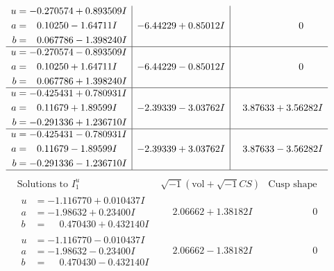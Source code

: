 \documentclass[1p]{elsarticle_modified}
\theoremstyle{definition}
\newcommand{\I}{\sqrt{-1}}
\begin{document}
$$\begin{array}{c|c|c}
\begin{aligned}
u &= -0.270574 + 0.893509 I \\
a &= \phantom{-}0.10250 - 1.64711 I \\
b &= \phantom{-}0.067786 - 1.398240 I\end{aligned}
 & -6.44229 + 0.85012 I & \phantom{-0.000000 } 0 \\ \hline\begin{aligned}
u &= -0.270574 - 0.893509 I \\
a &= \phantom{-}0.10250 + 1.64711 I \\
b &= \phantom{-}0.067786 + 1.398240 I\end{aligned}
 & -6.44229 - 0.85012 I & \phantom{-0.000000 } 0 \\ \hline\begin{aligned}
u &= -0.425431 + 0.780931 I \\
a &= \phantom{-}0.11679 + 1.89599 I \\
b &= -0.291336 + 1.236710 I\end{aligned}
 & -2.39339 - 3.03762 I & \phantom{-}3.87633 + 3.56282 I \\ \hline\begin{aligned}
u &= -0.425431 - 0.780931 I \\
a &= \phantom{-}0.11679 - 1.89599 I \\
b &= -0.291336 - 1.236710 I\end{aligned}
 & -2.39339 + 3.03762 I & \phantom{-}3.87633 - 3.56282 I\\
 \hline 
 \end{array}$$\newpage$$\begin{array}{c|c|c}  
\text{Solutions to }I^u_{1}& \I (\text{vol} + \sqrt{-1}CS) & \text{Cusp shape}\\
 \hline 
\begin{aligned}
u &= -1.116770 + 0.010437 I \\
a &= -1.98632 + 0.23400 I \\
b &= \phantom{-}0.470430 + 0.432140 I\end{aligned}
 & \phantom{-}2.06662 + 1.38182 I & \phantom{-0.000000 } 0 \\ \hline\begin{aligned}
u &= -1.116770 - 0.010437 I \\
a &= -1.98632 - 0.23400 I \\
b &= \phantom{-}0.470430 - 0.432140 I\end{aligned}
 & \phantom{-}2.06662 - 1.38182 I & \phantom{-0.000000 } 0 \\ \hline\begin{aligned}

\end{aligned}
\end{array}$$
\end{document}
